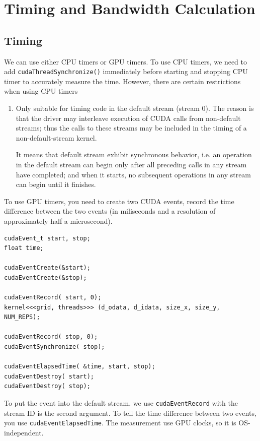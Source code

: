
\chapter{Timing and Bandwidth Calculation}
\label{chap:Timing_Bandwidth}

\section{Timing}
\label{sec:timing}

We can use either CPU timers or GPU timers. To use CPU timers, we need
to  add \verb!cudaThreadSynchronize()! immediately before starting
and stopping CPU timer to accurately measure the time. 
However, there are certain restrictions when using CPU timers

\begin{enumerate}
\item Only suitable for timing code in the default stream (stream
  0). The reason is that the driver may interleave execution of CUDA
  calls from non-default streams; thus the calls to these streams may
  be included in the timing of a non-default-stream kernel.

  It means that default stream exhibit synchronous behavior, i.e. an
  operation in the default stream can begin only after all preceding
  calls in any stream have completed; and when it starts, no
  subsequent operations in any stream can begin until it finishes. 
\end{enumerate}

To use GPU timers, you need to create two CUDA events, record the time
difference between the two events (in miliseconds and a resolution of
approximately half a microsecond).

\begin{lstlisting}
cudaEvent_t start, stop;
float time;

cudaEventCreate(&start);
cudaEventCreate(&stop);

cudaEventRecord( start, 0);
kernel<<<grid, threads>>> (d_odata, d_idata, size_x, size_y,
NUM_REPS);

cudaEventRecord( stop, 0);
cudaEventSynchronize( stop);

cudaEventElapsedTime( &time, start, stop);
cudaEventDestroy( start);
cudaEventDestroy( stop);
\end{lstlisting}

To put the event into the default stream, we use
\verb!cudaEventRecord! with the stream ID is the second argument. To
tell the time difference between two events, you use
\verb!cudaEventElapsedTime!. The measurement use GPU clocks, so it is
OS-independent.

